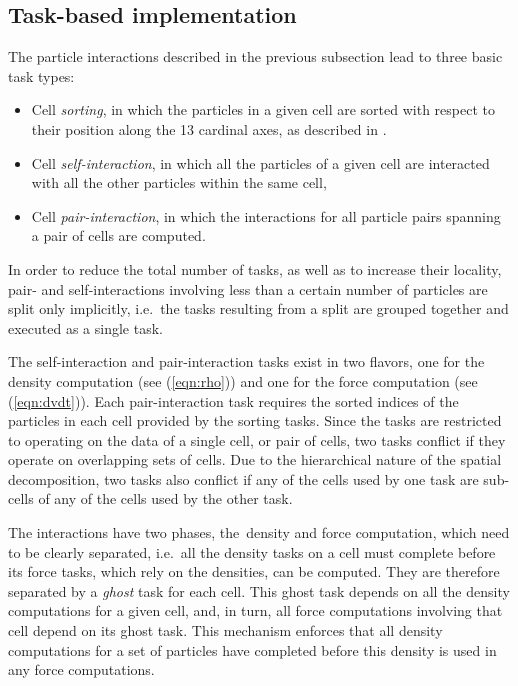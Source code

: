 \documentclass[final]{siamltex}
\newcommand{\eqn}[1]
    {(\ref{eqn:#1})}
\begin{document}
\subsection{Task-based implementation}

The particle interactions described in the previous subsection
lead to three basic task types:
%
\begin{itemize}
    \item Cell {\em sorting}, in which the particles in a given
        cell are sorted with respect to their position along the
        13 cardinal axes, as described in \cite{ref:Gonnet2013}.
    \item Cell {\em self-interaction}, in which all the particles
        of a given cell are interacted with all the other particles
        within the same cell,
    \item Cell {\em pair-interaction}, in which the interactions for
        all particle pairs spanning a pair of cells are computed. 
\end{itemize}
%
In order to reduce the total number of tasks,
as well as to increase their locality, pair- and self-interactions involving
less than a certain number
of particles are split only implicitly, i.e.~the tasks resulting
from a split are grouped together and executed as a single
task.

The self-interaction and pair-interaction tasks exist in
two flavors, one for the density computation (see \eqn{rho})
and one for the force computation (see \eqn{dvdt}).
Each pair-interaction task requires the sorted indices of
the particles in each cell provided by the sorting tasks.
Since the tasks are restricted to operating on the data of a
single cell, or pair of cells, two tasks conflict if they
operate on overlapping sets of cells.
Due to the hierarchical nature of the spatial decomposition,
two tasks also conflict if any of the cells used by one task
are sub-cells of any of the cells used by the other task.

The interactions have two phases, the~density and force
computation, which need to be clearly separated, i.e.~all the density
tasks on a cell must complete before its force tasks, which
rely on the densities, can be computed.
They are therefore separated by a {\em ghost}
task for each cell.
This ghost task depends on all the density computations
for a given cell, and, in turn, all force computations involving
that cell depend on its ghost task.
This mechanism enforces that all density computations
for a set of particles have completed before this
density is used in any force computations.
\end{document}
